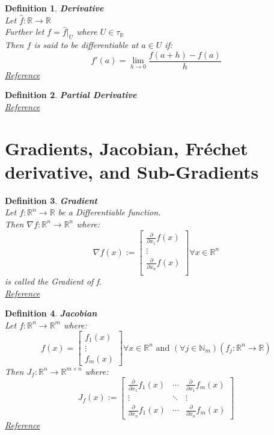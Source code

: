 \documentclass[12pt]{extarticle}
\theoremstyle{plain}
\theoremstyle{Definition}
\newtheorem{def.}{Definition}[section]
\theoremstyle{Definition}
\theoremstyle{plain}
\begin{document}
\begin{def.} \textbf{Derivative} \\ 
	Let $\hat{f} : \mathbb{R} \to \mathbb{R}$ \\ 
	Further let $f = \hat{f}|_U$ where $U \in \tau_\mathbb{R}$ \\ 
	Then $f$ is said to be differentiable at $a \in U$ if: \\ 
	$$f'(a) = \lim_{h \to 0} \frac{f(a + h) - f(a)}{h}$$
	\href{https://en.wikipedia.org/wiki/Differentiable_function}{Reference}
\end{def.}
\begin{def.} \textbf{Partial Derivative} \\
	\href{https://en.wikipedia.org/wiki/Partial_derivative}{Reference}
\end{def.}
\newpage
\section{Gradients, Jacobian, Fréchet derivative, and Sub-Gradients} 
\begin{def.} \textbf{Gradient} \\ 
	Let $f : \mathbb{R}^n \to \mathbb{R}$ be a Differentiable function. \\ 
	Then $\nabla f: \mathbb{R}^n \to \mathbb{R}^n$ where: \\ 
	\[
	\nabla f(x) := 
	\begin{bmatrix}
	\frac{\partial }{\partial x_1}f(x) \\ 
	\vdots \\
	\frac{\partial }{\partial x_n}f(x) \\ 				
	\end{bmatrix}
	\forall x \in \mathbb{R}^n
	\]
	is called the Gradient of f. \\
	\href{https://en.wikipedia.org/wiki/Gradient}{Reference}
\end{def.}
\begin{def.} \textbf{Jacobian} \\ 
	Let $f : \mathbb{R}^n \to \mathbb{R}^m$ where: 
	\[
	f(x) = 
	\begin{bmatrix}
	f_1(x) \\ 
	\vdots \\ 
	f_m(x) 
	\end{bmatrix}
	\forall x \in \mathbb{R}^n \text{ and } (\forall j \in \mathbb{N}_m) (f_j : \mathbb{R}^n \to \mathbb{R}) 
	\]
	Then $J_f : \mathbb{R}^n \to \mathbb{R}^{m \times n}$ where: \\  
	\[
	J_f(x) := 
	\begin{bmatrix} 
	\frac{\partial }{\partial x_1}f_1(x) & \cdots & \frac{\partial }{\partial x_1}f_m(x) \\
	\vdots & \ddots & \vdots \\ 
	\frac{\partial }{\partial x_n}f_1(x) & \cdots & \frac{\partial }{\partial x_n}f_m(x) 
	\end{bmatrix}
	\]
	\href{https://en.wikipedia.org/wiki/Jacobian_matrix_and_determinant}{Reference}
\end{def.}
\end{document}
